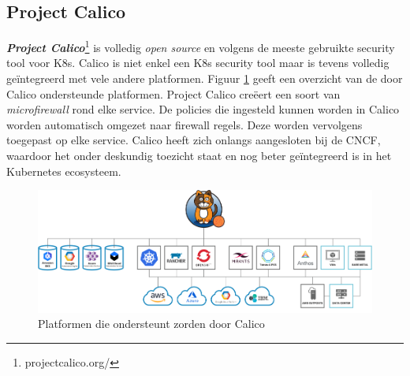 \subsection{Project Calico} \label{Calico}

\textbf{\textit{Project Calico}}\footnote{projectcalico.org/} is volledig \textit{open source} en volgens \textcite{Armstrong2021} de meeste gebruikte security tool voor K8s. Calico is niet enkel een K8s security tool maar is tevens volledig geïntegreerd met vele andere platformen. Figuur \ref{fig:CalicaEco} geeft een overzicht van de door Calico ondersteunde platformen. Project Calico creëert een soort van \textit{microfirewall} rond elke service. De policies die ingesteld kunnen worden in Calico worden automatisch omgezet naar firewall regels. Deze worden vervolgens toegepast op elke service. Calico heeft zich onlangs aangesloten bij de CNCF, waardoor het onder deskundig toezicht staat en nog beter geïntegreerd is in het Kubernetes ecosysteem.
\begin{figure}[ht]
    \centering
    \includegraphics[width=\linewidth]{img/Calico-Ecosystem.png}
    \caption{Platformen die ondersteunt zorden door Calico \autocite{Tigera2021}}
    \label{fig:CalicaEco}
\end{figure}

